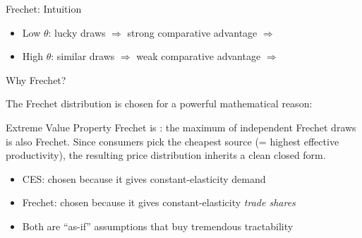 \documentclass{beamer}
\begin{document}
\begin{frame}{Frechet: Intuition}

    \begin{center}
    \end{center}

    \vspace{-0.3em}
    \begin{itemize}
        \item Low $\theta$: lucky draws $\Rightarrow$ strong comparative advantage $\Rightarrow$ 
        \item High $\theta$: similar draws $\Rightarrow$ weak comparative advantage $\Rightarrow$ 
    \end{itemize}

\end{frame}

\begin{frame}{Why Frechet?}

    The Frechet distribution is chosen for a powerful mathematical reason:

    \vspace{0.3em}
    \begin{exampleblock}{Extreme Value Property}
        Frechet is : the maximum of independent Frechet draws is also Frechet. Since consumers pick the cheapest source (= highest effective productivity), the resulting price distribution inherits a clean closed form.
    \end{exampleblock}

    \vspace{0.3em}
    \begin{itemize}
        \item CES: chosen because it gives constant-elasticity demand
        \item Frechet: chosen because it gives constant-elasticity \emph{trade shares}
        \item Both are ``as-if'' assumptions that buy tremendous tractability
    \end{itemize}

    \vspace{0.2em}

\end{frame}
\end{document}
